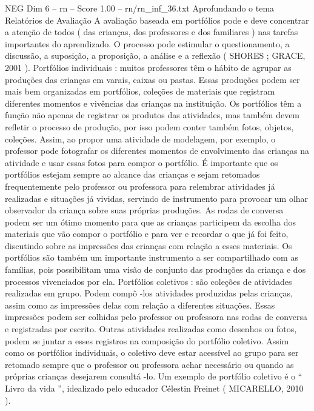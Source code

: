\begin{textsample}{NEG Dim 6 – rn – Score 1.00 – rn/rn\_inf\_36.txt}  \label{ex:f6_neg_055}
Aprofundando o tema Relatórios de Avaliação A avaliação baseada em portfólios pode e deve concentrar a atenção de todos ( das crianças, dos professores e dos familiares ) nas tarefas importantes do aprendizado.
O processo pode estimular o questionamento, a discussão, a suposição, a proposição, a análise e a reflexão ( SHORES ; GRACE, 2001 ).
Portfólios individuais : muitos professores têm o hábito de agrupar as produções das crianças em varais, caixas ou pastas.
Essas produções podem ser mais bem organizadas em portfólios, coleções de materiais que registram diferentes momentos e vivências das crianças na instituição.
Os portfólios têm a função não apenas de registrar os produtos das atividades, mas também devem refletir o processo de produção, por isso podem conter também fotos, objetos, coleções.
Assim, ao propor uma atividade de modelagem, por exemplo, o professor pode fotografar os diferentes momentos de envolvimento das crianças na atividade e usar essas fotos para compor o portfólio.
É importante que os portfólios estejam sempre ao alcance das crianças e sejam retomados frequentemente pelo professor ou professora para relembrar atividades já realizadas e situações já vividas, servindo de instrumento para provocar um olhar observador da criança sobre suas próprias produções.
As rodas de conversa podem ser um ótimo momento para que as crianças participem da escolha dos materiais que vão compor o portfólio e para ver e recordar o que já foi feito, discutindo sobre as impressões das crianças com relação a esses materiais.
Os portfólios são também um importante instrumento a ser compartilhado com as famílias, pois possibilitam uma visão de conjunto das produções da criança e dos processos vivenciados por ela.
Portfólios coletivos : são coleções de atividades realizadas em grupo.
Podem compô -los atividades produzidas pelas crianças, assim como as impressões delas com relação a diferentes situações.
Essas impressões podem ser colhidas pelo professor ou professora nas rodas de conversa e registradas por escrito.
Outras atividades realizadas como desenhos ou fotos, podem se juntar a esses registros na composição do portfólio coletivo.
Assim como os portfólios individuais, o coletivo deve estar acessível ao grupo para ser retomado sempre que o professor ou professora achar necessário ou quando as próprias crianças desejarem consultá -lo.
Um exemplo de portfólio coletivo é o “ Livro da vida ”, idealizado pelo educador Célestin Freinet ( MICARELLO, 2010 ).

\end{textsample}
